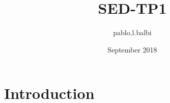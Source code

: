\documentclass{article}
\title{SED-TP1}
\author{pablo.l.balbi }
\date{September 2018}
\begin{document}
\maketitle

\section{Introduction}
\end{document}
